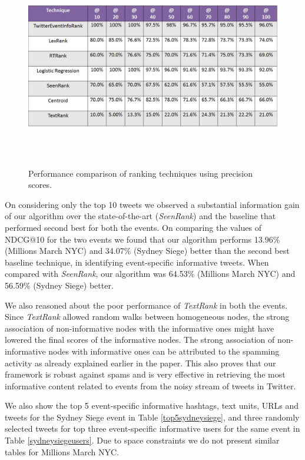 \begin{figure}[htbp]
\centering
\includegraphics[height=3.5in,width=5.5in]{Figures/sydneysiegeprecision.jpg}
\caption{\small Performance comparison of ranking techniques using precision scores.}
\label{sydneysiegeprecision}
\end{figure}

On considering only the top 10 tweets we observed a substantial information gain of our algorithm over the state-of-the-art (\textit{SeenRank}) and the baseline that performed second best for both the events. On comparing the values of NDCG@10 for the two events we found that our algorithm performs 13.96\% (Millions March NYC) and 34.07\% (Sydney Siege) better than the second best baseline technique, in identifying event-specific informative tweets. When compared with \textit{SeenRank}, our algorithm was 64.53\% (Millions March NYC) and 56.59\% (Sydney Siege) better. 

We also reasoned about the poor performance of \textit{TextRank} in both the events. Since \textit{TextRank} allowed random walks between homogeneous nodes, the strong association of non-informative nodes with the informative ones might have lowered the final scores of the informative nodes. The strong association of non-informative nodes with informative ones can be attributed to the spamming activity as already explained earlier in the paper. This also proves that our framework is robust against spams and is very effective in retrieving the most informative content related to events from the noisy stream of tweets in Twitter. 

We also show the top 5 event-specific informative hashtags, text units, URLs and tweets for the Sydney Siege event in Table \ref{top5sydneysiege}, and three randomly selected tweets for top three event-specific informative users for the same event in Table \ref{sydneysiegeusers}. Due to space constraints we do not present similar tables for Millions March NYC.
